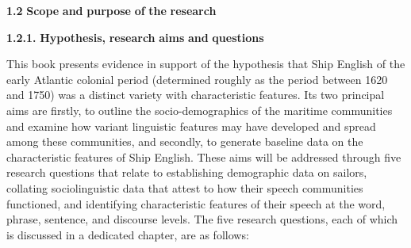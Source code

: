 \begin{styleNormali}
\textbf{1.2} \textbf{Scope} \textbf{and} \textbf{purpose} \textbf{of} \textbf{the} \textbf{research}  
\end{styleNormali}

\begin{styleNormali}
\textbf{1.2.1.} \textbf{Hypothesis,} \textbf{research} \textbf{aims} \textbf{and} \textbf{questions}
\end{styleNormali}

\begin{styleNormali}
This book presents evidence in support of the hypothesis that Ship English of the early Atlantic colonial period (determined roughly as the period between 1620 and 1750) was a distinct variety with characteristic features. Its two principal aims are firstly, to outline the socio-demographics of the maritime communities and examine how variant linguistic features may have developed and spread among these communities, and secondly, to generate baseline data on the characteristic features of Ship English. These aims will be addressed through five research questions that relate to establishing demographic data on sailors, collating sociolinguistic data that attest to how their speech communities functioned, and identifying characteristic features of their speech at the word, phrase, sentence, and discourse levels. The five research questions, each of which is discussed in a dedicated chapter, are as follows:
\end{styleNormali}


